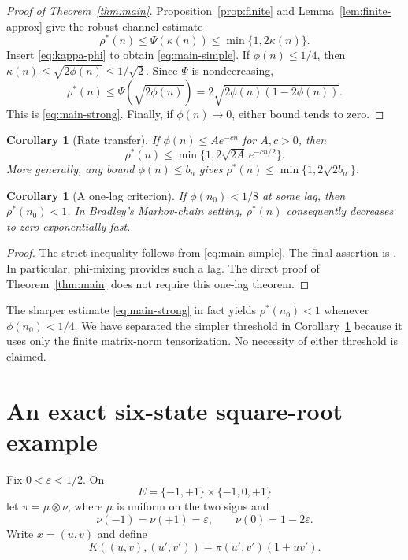 \documentclass[11pt]{amsart}
\numberwithin{equation}{section}
\newtheorem{corollary}[theorem]{Corollary}
\theoremstyle{definition}
\newcommand{\rhostar}{\rho^{*}}
\begin{document}
\begin{proof}[Proof of Theorem~\ref{thm:main}]
Proposition~\ref{prop:finite} and Lemma~\ref{lem:finite-approx} give the robust-channel estimate
\begin{equation}\label{eq:robust-global}
\rhostar(n)\le\Psi(\kappa(n))\le\min\{1,2\kappa(n)\}.
\end{equation}
Insert \eqref{eq:kappa-phi} to obtain \eqref{eq:main-simple}. If $\phi(n)\le1/4$, then $\kappa(n)\le\sqrt{2\phi(n)}\le1/\sqrt2$. Since $\Psi$ is nondecreasing,
\[
\rhostar(n)\le\Psi(\sqrt{2\phi(n)})
=2\sqrt{2\phi(n)(1-2\phi(n))}.
\]
This is \eqref{eq:main-strong}. Finally, if $\phi(n)\to0$, either bound tends to zero.
\end{proof}

\begin{corollary}[Rate transfer]\label{cor:rate}
If $\phi(n)\le A e^{-cn}$ for $A,c>0$, then
\[
\rhostar(n)\le\min\{1,2\sqrt{2A}\,e^{-cn/2}\}.
\]
More generally, any bound $\phi(n)\le b_n$ gives $\rhostar(n)\le\min\{1,2\sqrt{2b_n}\}$.
\end{corollary}

\begin{corollary}[A one-lag criterion]\label{cor:one-lag}
If $\phi(n_0)<1/8$ at some lag, then $\rhostar(n_0)<1$. In Bradley's Markov-chain setting, $\rhostar(n)$ consequently decreases to zero exponentially fast.
\end{corollary}

\begin{proof}
The strict inequality follows from \eqref{eq:main-simple}. The final assertion is \cite[Theorem~3.3(6)]{Bradley2005}. In particular, phi-mixing provides such a lag. The direct proof of Theorem~\ref{thm:main} does not require this one-lag theorem.
\end{proof}

The sharper estimate \eqref{eq:main-strong} in fact yields $\rhostar(n_0)<1$ whenever $\phi(n_0)<1/4$. We have separated the simpler threshold in Corollary~\ref{cor:one-lag} because it uses only the finite matrix-norm tensorization. No necessity of either threshold is claimed.

\section{An exact six-state square-root example}\label{sec:six-state}

Fix $0<\varepsilon<1/2$. On
\[
E=\{-1,+1\}\times\{-1,0,+1\}
\]
let $\pi=\mu\otimes\nu$, where $\mu$ is uniform on the two signs and
\[
\nu(-1)=\nu(+1)=\varepsilon,\qquad \nu(0)=1-2\varepsilon.
\]
Write $x=(u,v)$ and define
\begin{equation}\label{eq:six-kernel}
K((u,v),(u',v'))=\pi(u',v')(1+uv').
\end{equation}
\end{document}
